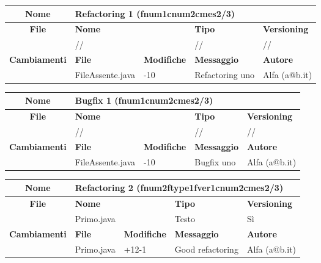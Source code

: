 \begin{table}[ht]
\footnotesize
\begin{tabular}{|c|p{2.5cm}|p{2cm}|p{2.5cm}|p{2.5cm}|}
  \hline
  \textbf{Nome}	& \multicolumn{4}{l|}{Refactoring 1 (fnum1cnum2cmes2/3)} 										\\
  \hline
  \rowcolor{lightgray}\textbf{File} 		& \multicolumn{2}{l|}{\textbf{Nome}}		& \textbf{Tipo}		& \textbf{Versioning} 		\\
						\cline{2-5}
						& \multicolumn{2}{l|}{//}			& //			& //				\\
  \hline
  \rowcolor{lightgray}\textbf{Cambiamenti}	& \textbf{File}		&\textbf{Modifiche}	& \textbf{Messaggio}	& \textbf{Autore}		\\
						\cline{2-5}
						& FileAssente.java	& -10	  		& Refactoring uno	& Alfa (a@b.it)			\\
  \hline
\end{tabular}
\end{table}

\begin{table}[ht]
\footnotesize
\begin{tabular}{|c|p{2.5cm}|p{2cm}|p{2.5cm}|p{2.5cm}|}
  \hline
  \textbf{Nome}	& \multicolumn{4}{l|}{Bugfix 1 (fnum1cnum2cmes2/3)} 											\\
  \hline
  \rowcolor{lightgray}\textbf{File} 		& \multicolumn{2}{l|}{\textbf{Nome}}		& \textbf{Tipo}		& \textbf{Versioning} 		\\
						\cline{2-5}
						& \multicolumn{2}{l|}{//}			& //			& //				\\
  \hline
  \rowcolor{lightgray}\textbf{Cambiamenti}	& \textbf{File}		&\textbf{Modifiche}	& \textbf{Messaggio}	& \textbf{Autore}		\\
						\cline{2-5}
						& FileAssente.java	& -10	  		&  Bugfix uno		& Alfa (a@b.it)			\\
  \hline
\end{tabular}
\end{table}



\begin{table}[ht]
\footnotesize
\begin{tabular}{|c|p{2.5cm}|p{2cm}|p{2.5cm}|p{2.5cm}|}
  \hline
  \textbf{Nome}	& \multicolumn{4}{l|}{Refactoring 2 (fnum2ftype1fver1cnum2cmes2/3)}			 						\\
  \hline
  \rowcolor{lightgray}\textbf{File} 		& \multicolumn{2}{l|}{\textbf{Nome}}		& \textbf{Tipo}		& \textbf{Versioning} 		\\
						\cline{2-5}
						& \multicolumn{2}{l|}{Primo.java}		& Testo			& Sì				\\
  \hline
  \rowcolor{lightgray}\textbf{Cambiamenti}	& \textbf{File}		&\textbf{Modifiche}	& \textbf{Messaggio}	& \textbf{Autore}		\\
						\cline{2-5}
						& Primo.java		& +12-1	 		& Good refactoring	& Alfa (a@b.it)			\\
						
  \hline
\end{tabular}
\end{table}

